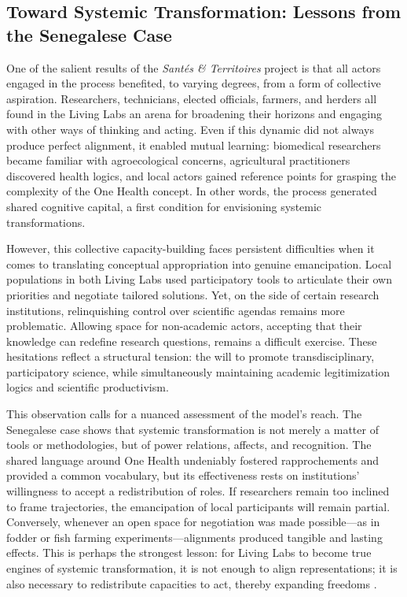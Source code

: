 \documentclass{article}
\begin{document}
\subsection{Toward Systemic Transformation: Lessons from the Senegalese Case}

One of the salient results of the \textit{Santés \& Territoires} project is that all actors engaged in the process benefited, to varying degrees, from a form of collective aspiration. Researchers, technicians, elected officials, farmers, and herders all found in the Living Labs an arena for broadening their horizons and engaging with other ways of thinking and acting. Even if this dynamic did not always produce perfect alignment, it enabled mutual learning: biomedical researchers became familiar with agroecological concerns, agricultural practitioners discovered health logics, and local actors gained reference points for grasping the complexity of the One Health concept. In other words, the process generated shared cognitive capital, a first condition for envisioning systemic transformations.  

However, this collective capacity-building faces persistent difficulties when it comes to translating conceptual appropriation into genuine emancipation. Local populations in both Living Labs used participatory tools to articulate their own priorities and negotiate tailored solutions. Yet, on the side of certain research institutions, relinquishing control over scientific agendas remains more problematic. Allowing space for non-academic actors, accepting that their knowledge can redefine research questions, remains a difficult exercise. These hesitations reflect a structural tension: the will to promote transdisciplinary, participatory science, while simultaneously maintaining academic legitimization logics and scientific productivism.  

This observation calls for a nuanced assessment of the model’s reach. The Senegalese case shows that systemic transformation is not merely a matter of tools or methodologies, but of power relations, affects, and recognition. The shared language around One Health undeniably fostered rapprochements and provided a common vocabulary, but its effectiveness rests on institutions’ willingness to accept a redistribution of roles. If researchers remain too inclined to frame trajectories, the emancipation of local participants will remain partial. Conversely, whenever an open space for negotiation was made possible—as in fodder or fish farming experiments—alignments produced tangible and lasting effects. This is perhaps the strongest lesson: for Living Labs to become true engines of systemic transformation, it is not enough to align representations; it is also necessary to redistribute capacities to act, thereby expanding freedoms \parencite{sen_development_1999}. 
\end{document}
